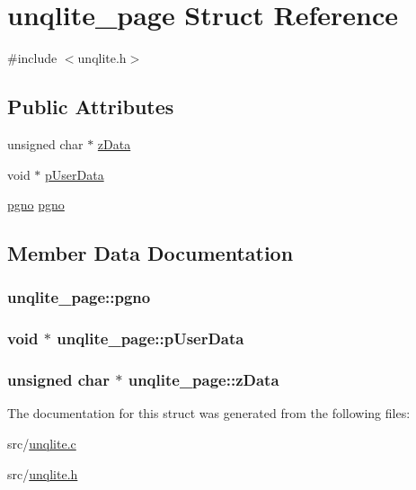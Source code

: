 \hypertarget{structunqlite__page}{\section{unqlite\-\_\-page Struct Reference}
\label{d0/da2/structunqlite__page}
}


{\ttfamily \#include $<$unqlite.\-h$>$}

\subsection*{Public Attributes}
\begin{DoxyCompactItemize}
\item 
unsigned char $\ast$ \hyperlink{structunqlite__page_a02e059de30e40192d4279974cf7526da}{z\-Data}
\item 
void $\ast$ \hyperlink{structunqlite__page_a12138d390d36aa303e82f92fc78a828b}{p\-User\-Data}
\item 
\hyperlink{unqlite_8c_a90bf132c9229151f7c29e84e592907cd}{pgno} \hyperlink{structunqlite__page_a613be2d36d1142ac9f8c9ee21e0080a2}{pgno}
\end{DoxyCompactItemize}


\subsection{Member Data Documentation}
\hypertarget{structunqlite__page_a613be2d36d1142ac9f8c9ee21e0080a2}{
\subsubsection[{pgno}]{ unqlite\-\_\-page\-::pgno}}\label{d0/da2/structunqlite__page_a613be2d36d1142ac9f8c9ee21e0080a2}
\hypertarget{structunqlite__page_a12138d390d36aa303e82f92fc78a828b}{
\subsubsection[{p\-User\-Data}]{\setlength{\rightskip}{0pt plus 5cm}void $\ast$ unqlite\-\_\-page\-::p\-User\-Data}}\label{d0/da2/structunqlite__page_a12138d390d36aa303e82f92fc78a828b}
\hypertarget{structunqlite__page_a02e059de30e40192d4279974cf7526da}{
\subsubsection[{z\-Data}]{\setlength{\rightskip}{0pt plus 5cm}unsigned char $\ast$ unqlite\-\_\-page\-::z\-Data}}\label{d0/da2/structunqlite__page_a02e059de30e40192d4279974cf7526da}


The documentation for this struct was generated from the following files\-:\begin{DoxyCompactItemize}
\item 
src/\hyperlink{unqlite_8c}{unqlite.\-c}\item 
src/\hyperlink{unqlite_8h}{unqlite.\-h}\end{DoxyCompactItemize}
